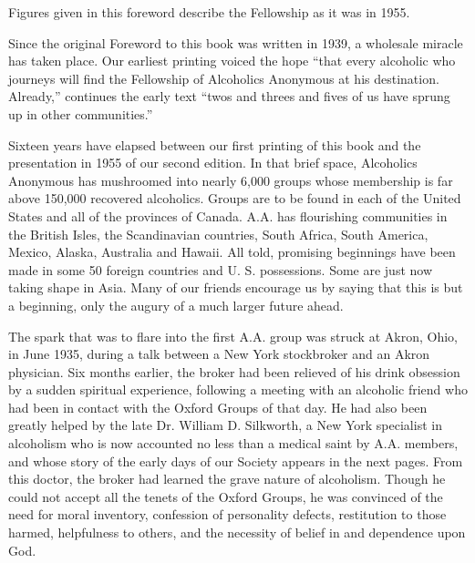 \begin{biblechapter}
    Figures given in this foreword describe the
    Fellowship as it was in 1955.

    Since the original Foreword to this book was written in 1939, 
    a wholesale miracle has taken place. 
\verse Our earliest printing voiced the hope 
    “that every alcoholic who journeys 
    will find the Fellowship of Alcoholics Anonymous at his destination. 
    Already,”
    continues the early text 
    “twos and threes and fives of us have sprung up in other communities.”

\verse Sixteen years have elapsed between our first printing of this book 
    and the presentation in 1955 of our second edition.
\verse In that brief space, 
    Alcoholics Anonymous has mushroomed into nearly 6,000 groups 
    whose membership is far above 150,000 recovered alcoholics.
\verse Groups are to be found in each of the United States 
    and all of the provinces of Canada.
\verse A.A. has flourishing communities 
    in the British Isles, the Scandinavian countries, South Africa, 
    South America, Mexico, Alaska, Australia and Hawaii. 
\verse All told, promising beginnings have been made 
    in some 50 foreign countries and U. S. possessions. 
\verse Some are just now taking shape in Asia. 
\verse Many of our friends encourage us by saying that 
    this is but a beginning, 
    only the augury of a much larger future ahead.

    The spark that was to flare into the first A.A. group 
    was struck at Akron, Ohio, in June 1935, 
    during a talk between a New York stockbroker and an Akron physician. 
\verse Six months earlier, 
    the broker had been relieved of his drink obsession 
    by a sudden spiritual experience, %
    following a meeting with an alcoholic friend 
    who had been in contact with the Oxford Groups of that day. 
\verse He had also been greatly helped by 
    the late Dr. William D. Silkworth, 
    a New York specialist in alcoholism who 
    is now accounted no less than a medical saint by A.A. members, 
    and whose story of the early days of our Society 
    appears in the next pages. 
\verse From this doctor, 
    the broker had learned the grave nature of alcoholism. 
\verse Though he could not accept all the tenets of the Oxford Groups, 
    he was convinced of the need for moral inventory, 
    confession of personality defects, 
    restitution to those harmed, 
    helpfulness to others, 
    and the necessity of belief in and dependence upon God.


\end{biblechapter}
